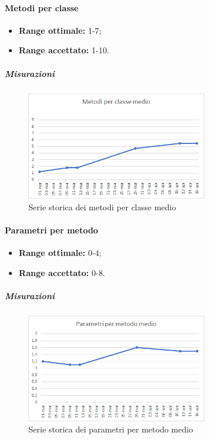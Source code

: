 			\paragraph{Metodi per classe} \Spazio
			\begin{itemize}
				\item \textbf{Range ottimale:} 1-7; 
				\item \textbf{Range accettato:} 1-10.
			\end{itemize}
		    \subparagraph{Misurazioni}
		    \begin{figure}[H]
		    	\centering 
		    	\includegraphics[width=0.7\textwidth]{Images/metodi.png}
		    	\caption{Serie storica dei metodi per classe medio}
		    	\label{metodi} 
		    \end{figure}
			\paragraph{Parametri per metodo} \Spazio
			\begin{itemize}
				\item \textbf{Range ottimale:} 0-4;
				\item \textbf{Range accettato:} 0-8.
			\end{itemize}
		    \subparagraph{Misurazioni}
		    \begin{figure}[H]
		    	\centering 
		    	\includegraphics[width=0.7\textwidth]{Images/parametri.png}
		    	\caption{Serie storica dei parametri per metodo medio}
		    	\label{parametri} 
		    \end{figure}
			
